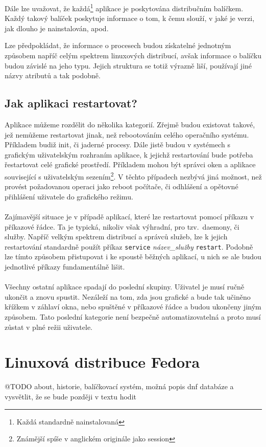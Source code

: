 \documentclass[
  field=inf,
  biblatex,
  glossaries,
  index
]{kidiplom}
\begin{document}
	Dále lze uvažovat, že každá\footnote{Každá standardně nainstalovaná} aplikace je poskytována distribučním balíčkem. Každý takový balíček poskytuje informace o tom, k čemu slouží, v jaké je verzi, jak dlouho je nainstalován, apod.

	Lze předpokládat, že informace o procesech budou získatelné jednotným způsobem napříč celým spektrem linuxových distribucí, avšak informace o balíčku budou závislé na jeho typu. Jejich struktura se totiž výrazně liší, používají jiné názvy atributů a tak podobně.

	\subsection{Jak aplikaci restartovat?}
	Aplikace můžeme rozdělit do několika kategorií. Zřejmě budou existovat takové, jež nemůžeme restartovat jinak, než rebootováním celého operačního systému. Příkladem budiž init, či jaderné procesy. Dále jistě budou v systémech s grafickým uživatelským rozhraním aplikace, k jejichž restartování bude potřeba řestartovat celé grafické prostředí. Příkladem mohou být správci oken a aplikace související s uživatelským sezením\footnote{Známější spíše v anglickém originále jako session}. V těchto případech nezbývá jiná možnost, než provést požadovanou operaci jako reboot počítače, či odhlášení a opětovné přihlášení uživatele do grafického režimu.
	\\
	\\
	Zajímavější situace je v případě aplikací, které lze restartovat pomocí příkazu v příkazové řádce. Ta je typická, nikoliv však výhradní, pro tzv.\ daemony, či služby. Napříč velkým spektrem distribucí a správců služeb, lze k jejich restartování standardně použít příkaz \texttt{service} \textit{název\_služby} \texttt{restart}. Podobně lze tímto způsobem přistupovat i ke spoustě běžných aplikací, u nich se ale budou jednotlivé příkazy fundamentálně lišit.
	\\
	\\
	Všechny ostatní aplikace spadají do poslední skupiny. Uživatel je musí ručně ukončit a znovu spustit. Nezáleží na tom, zda jsou grafické a bude tak učiněno křížkem v záhlaví okna, nebo spuštěné v příkazové řádce a budou ukončeny jiným způsobem. Tato poslední kategorie není bezpečně automatizovatelná a proto musí zůstat v plné režii uživatele.

\newpage
\section{Linuxová distribuce Fedora}
@TODO about, historie, balíčkovací systém, možná popis dnf databáze a vysvětlit, že se bude později v textu hodit
\end{document}
